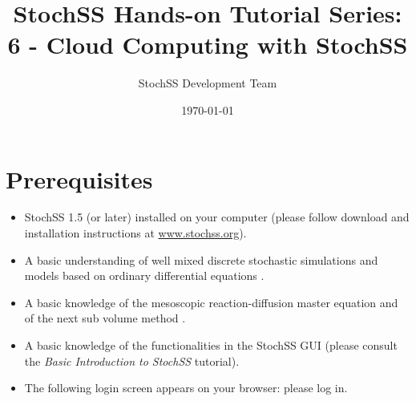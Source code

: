 \documentclass[12pt,notitlepage,nofootinbib]{revtex4}
\begin{document}
\title{StochSS Hands-on Tutorial Series: 6 - Cloud Computing with StochSS}

\author{StochSS Development Team}

\date{\today}

\maketitle

\section{\label{sec:pre}Prerequisites}
\begin{itemize}
\item StochSS 1.5 (or later) installed on your computer (please follow download and installation instructions at \url{www.stochss.org}). 
\item A basic understanding of well mixed discrete stochastic simulations and models based on ordinary differential equations \cite{dan,sundials}.
\item A basic knowledge of the mesoscopic reaction-diffusion master equation and of the next sub volume method \cite{nsm}.
\item  A basic knowledge of the functionalities in the StochSS GUI (please consult the \textit{Basic Introduction to StochSS} tutorial).
\item The following login screen appears on your browser: please log in.
\end{itemize}
\end{document}

